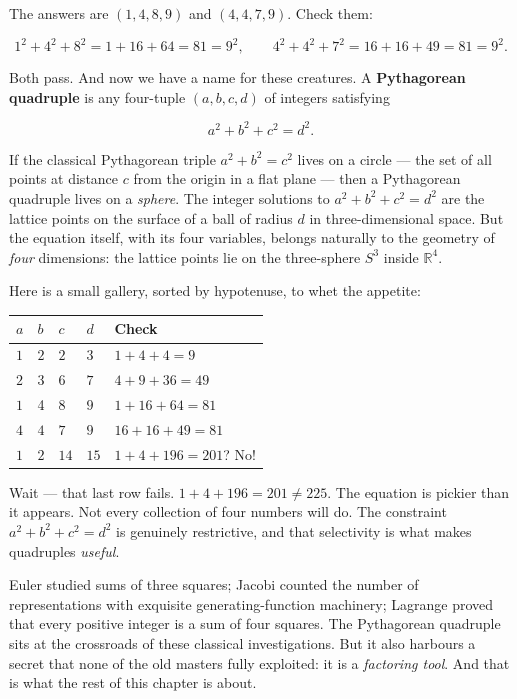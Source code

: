 The answers are $(1, 4, 8, 9)$ and $(4, 4, 7, 9)$. Check them:

\[1^2 + 4^2 + 8^2 = 1 + 16 + 64 = 81 = 9^2, \qquad 4^2 + 4^2 + 7^2 = 16 + 16 + 49 = 81 = 9^2.\]

Both pass. And now we have a name for these creatures. A \textbf{Pythagorean quadruple} is any four-tuple $(a, b, c, d)$ of integers satisfying

\[a^2 + b^2 + c^2 = d^2.\]

If the classical Pythagorean triple $a^2 + b^2 = c^2$ lives on a circle --- the set of all points at distance $c$ from the origin in a flat plane --- then a Pythagorean quadruple lives on a \textit{sphere}. The integer solutions to $a^2 + b^2 + c^2 = d^2$ are the lattice points on the surface of a ball of radius $d$ in three-dimensional space. But the equation itself, with its four variables, belongs naturally to the geometry of \textit{four} dimensions: the lattice points lie on the three-sphere $S^3$ inside $\mathbb{R}^4$.

Here is a small gallery, sorted by hypotenuse, to whet the appetite:


\begin{center}
\begin{tabular}{lllll}
\toprule
$a$ & $b$ & $c$ & $d$ & Check \\
\midrule
$1$ & $2$ & $2$ & $3$ & $1+4+4=9$ \\
$2$ & $3$ & $6$ & $7$ & $4+9+36=49$ \\
$1$ & 4 & $8$ & $9$ & $1+16+64=81$ \\
$4$ & $4$ & $7$ & $9$ & $16+16+49=81$ \\
$1$ & $2$ & $14$ & $\!15\!$ & $1+4+196=201$? No! \\
\bottomrule
\end{tabular}
\end{center}


Wait --- that last row fails. $1 + 4 + 196 = 201 \neq 225$. The equation is pickier than it appears. Not every collection of four numbers will do. The constraint $a^2 + b^2 + c^2 = d^2$ is genuinely restrictive, and that selectivity is what makes quadruples \textit{useful}.



Euler studied sums of three squares; Jacobi counted the number of representations with exquisite generating-function machinery; Lagrange proved that every positive integer is a sum of four squares. The Pythagorean quadruple sits at the crossroads of these classical investigations. But it also harbours a secret that none of the old masters fully exploited: it is a \textit{factoring tool}. And that is what the rest of this chapter is about.


